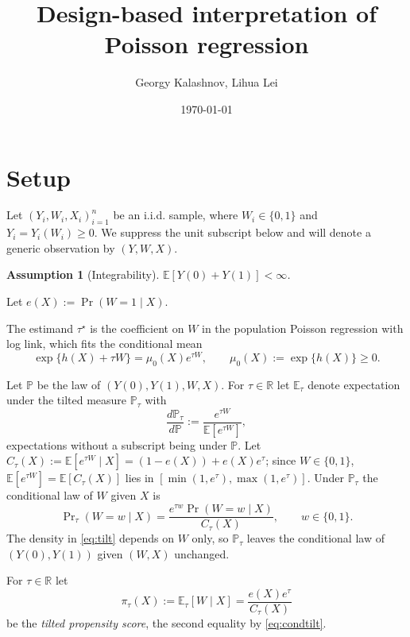 \documentclass[11pt]{article}
\title{Design-based interpretation of Poisson regression}
\author{Georgy Kalashnov, Lihua Lei}
\date{\today}
\newtheorem{assumption}{Assumption}
\theoremstyle{definition}
\theoremstyle{plain}
\newcommand{\E}{\mathbb{E}}
\newcommand{\1}{\mathbf{1}}
\newcommand{\R}{\mathbb{R}}
\begin{document}
\maketitle

\section{Setup}
\label{sec:setup}

Let $(Y_i,W_i,X_i)_{i=1}^n$ be an i.i.d. sample, where $W_i\in\{0,1\}$ and $Y_i=Y_i(W_i)\ge 0$. We suppress the unit subscript below and will denote a generic observation by $(Y,W,X)$.

\begin{assumption}[Integrability]
\label{as:integrability}
$\E[Y(0)+Y(1)]<\infty$.
\end{assumption}

Let $e(X):=\Pr(W=1\mid X)$.

The estimand $\tau^\star$ is the coefficient on $W$ in the population Poisson regression with log link, which fits the conditional mean
\begin{equation}
\exp\{h(X)+\tau W\}=\mu_0(X)e^{\tau W},
\qquad
\mu_0(X):=\exp\{h(X)\}\ge 0 .
\label{eq:loglink}
\end{equation}

Let $\mathbb P$ be the law of $(Y(0),Y(1),W,X)$.  For $\tau\in\R$ let $\E_\tau$ denote expectation under the tilted measure $\mathbb P_\tau$ with
\begin{equation}
\frac{d\mathbb P_\tau}{d\mathbb P}:=\frac{e^{\tau W}}{\E[e^{\tau W}]},
\label{eq:tilt}
\end{equation}
expectations without a subscript being under $\mathbb P$.  Let $C_\tau(X):=\E[e^{\tau W}\mid X]=(1-e(X))+e(X)e^{\tau}$; since $W\in\{0,1\}$, $\E[e^{\tau W}]=\E[C_\tau(X)]$ lies in $[\min(1,e^{\tau}),\max(1,e^{\tau})]$.  Under $\mathbb P_\tau$ the conditional law of $W$ given $X$ is
\begin{equation}
\Pr\nolimits_\tau(W=w\mid X)=\frac{e^{\tau w}\Pr(W=w\mid X)}{C_\tau(X)},
\qquad w\in\{0,1\}.
\label{eq:condtilt}
\end{equation}
The density in \eqref{eq:tilt} depends on $W$ only, so $\mathbb P_\tau$ leaves the conditional law of $(Y(0),Y(1))$ given $(W,X)$ unchanged.

For $\tau\in\R$ let
\begin{equation}
\pi_\tau(X):=\E_\tau[W\mid X]=\frac{e(X)e^{\tau}}{C_\tau(X)}
\label{eq:defpi}
\end{equation}
be the \emph{tilted propensity score}, the second equality by \eqref{eq:condtilt}.
\end{document}
